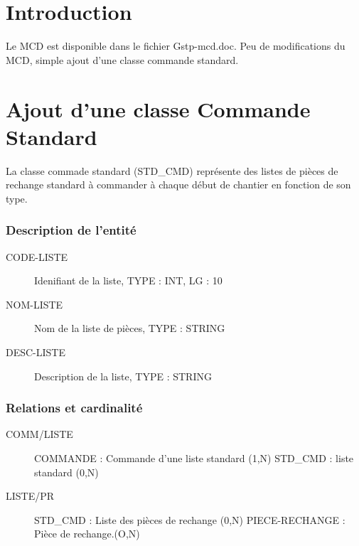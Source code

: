 \documentclass[a4paper]{article}
\begin{document}
\maketitle

\section{Introduction}
Le MCD est disponible dans le fichier Gstp-mcd.doc.
Peu de modifications du MCD, simple ajout d'une classe commande standard.


\section{Ajout d'une classe Commande Standard}

La classe commade standard (STD_CMD) représente des listes de pièces de 
rechange standard à commander à chaque début de chantier en fonction de son type.

\subsubsection{Description de l'entité}
\begin{description}
    \item[CODE-LISTE] Idenifiant de la liste, TYPE : INT, LG : 10
    \item[NOM-LISTE] Nom de la liste de pièces, TYPE : STRING
    \item[DESC-LISTE] Description de la liste, TYPE : STRING
\end{description}

\subsubsection{Relations et cardinalité}
\begin{description}
    \item[COMM/LISTE] COMMANDE : Commande d'une liste standard (1,N)\el
        STD_CMD : liste standard (0,N)
    \item[LISTE/PR] STD_CMD : Liste des pièces de rechange (0,N)\el
        PIECE-RECHANGE :  Pièce de rechange.(O,N)
\end{description}


\subsection{}
\end{document}
